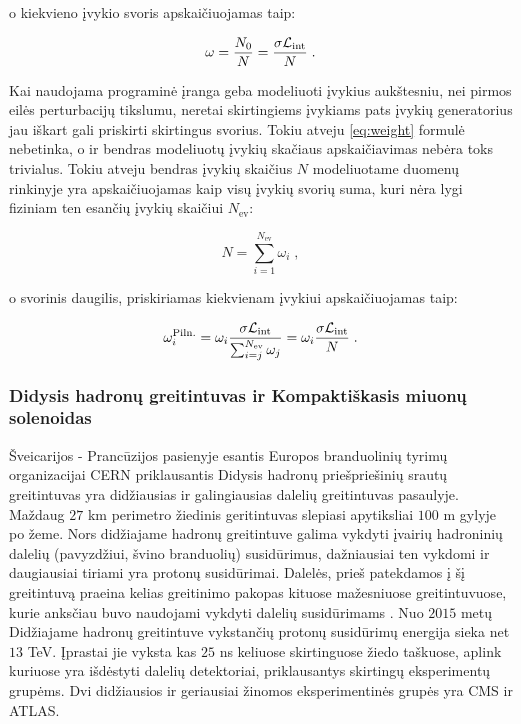 \documentclass[a4paper, 12pt]{article}
\newcommand{\Lumi}{{\cal L}_\mathrm{int}}
\newlength\q
\begin{document}
o kiekvieno įvykio svoris apskaičiuojamas taip:

\begin{equation}
	\omega = \frac{ N_{0} }{ N } = \frac{ \sigma \Lumi }{N} \; .
	\label{eq:weight}
\end{equation}

Kai naudojama programinė įranga geba modeliuoti įvykius aukštesniu, nei pirmos eilės
perturbacijų tikslumu, neretai skirtingiems įvykiams pats įvykių generatorius jau iškart
gali priskirti skirtingus svorius.
Tokiu atveju \eqref{eq:weight} formulė nebetinka, o ir bendras modeliuotų įvykių skačiaus
apskaičiavimas nebėra toks trivialus.
Tokiu atveju bendras įvykių skaičius $N$ modeliuotame duomenų rinkinyje yra apskaičiuojamas
kaip visų įvykių svorių suma, kuri nėra lygi fiziniam ten esančių įvykių skaičiui $N_{\mathrm{ev}}$:

\begin{equation}
	N = \sum_{i=1}^{N_{\mathrm{ev}}} \omega_{i} \; ,
\end{equation}

o svorinis daugilis, priskiriamas kiekvienam įvykiui apskaičiuojamas taip:

\begin{equation}
	\omega_{i}^{\mathrm{Piln.}} = \omega_{i} \frac{ \sigma\Lumi }{ \sum_{i=j}^{N_{\mathrm{ev}}}\omega_{j} } =
	\omega_{i} \frac{ \sigma\Lumi }{N} \; .
	\label{eq:NLOweight}
\end{equation}

\subsubsection{Didysis hadronų greitintuvas ir Kompaktiškasis miuonų solenoidas}

Šveicarijos - Prancūzijos pasienyje esantis Europos branduolinių tyrimų organizacijai CERN
priklausantis Didysis hadronų priešpriešinių srautų greitintuvas yra didžiausias ir galingiausias
dalelių greitintuvas pasaulyje.
Maždaug $27$ km perimetro žiedinis geritintuvas slepiasi apytiksliai $100$ m gylyje po žeme.
Nors didžiajame hadronų greitintuve galima vykdyti įvairių hadroninių dalelių (pavyzdžiui, švino
branduolių) susidūrimus, dažniausiai ten vykdomi ir daugiausiai tiriami yra protonų susidūrimai.
Dalelės, prieš patekdamos į šį greitintuvą praeina kelias greitinimo pakopas kituose mažesniuose
greitintuvuose, kurie anksčiau buvo naudojami vykdyti dalelių susidūrimams \cite{accelerators}.
Nuo $2015$ metų Didžiajame hadronų greitintuve vykstančių protonų susidūrimų energija sieka net $13$ TeV.
Įprastai jie vyksta kas $25$ ns keliuose skirtinguose žiedo taškuose, aplink kuriuose yra išdėstyti dalelių
detektoriai, priklausantys skirtingų eksperimentų grupėms.
Dvi didžiausios ir geriausiai žinomos eksperimentinės grupės yra CMS ir ATLAS.
\end{document}
